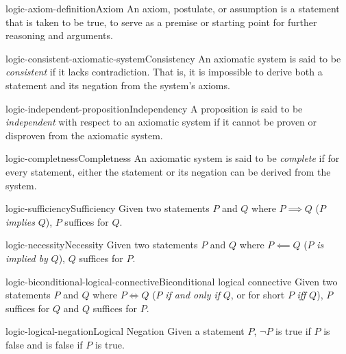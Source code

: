 \documentclass[preview]{standalone}
\begin{document}
\begin{snippet}{logic-axiom-definition}{Axiom}
    An axiom, postulate, or assumption is a statement that is taken to be true, to serve as a premise or starting point for further reasoning and arguments.
\end{snippet}

\begin{snippetdefinition}{logic-consistent-axiomatic-system}{Consistency}
    An axiomatic system is said to be \textit{consistent} if it lacks contradiction.
    That is, it is impossible to derive both a statement and its negation from the system's axioms.
\end{snippetdefinition}

\begin{snippetdefinition}{logic-independent-proposition}{Independency}
    A proposition is said to be \textit{independent} with respect to an axiomatic system
    if it cannot be proven or disproven from the axiomatic system.
\end{snippetdefinition}

\begin{snippetdefinition}{logic-completness}{Completness}
    An axiomatic system is said to be \textit{complete} if for every statement,
    either the statement or its negation can be derived from the system.
\end{snippetdefinition}

\begin{snippetdefinition}{logic-sufficiency}{Sufficiency}
    Given two statements \(P\) and \(Q\) where \(P \implies Q\) (\(P\) \textit{implies} \(Q\)),
    \(P\) suffices for \(Q\).
\end{snippetdefinition}

\begin{snippetdefinition}{logic-necessity}{Necessity}
    Given two statements \(P\) and \(Q\) where \(P \impliedby Q\) (\(P\) \textit{is implied by} \(Q\)),
    \(Q\) suffices for \(P\).
\end{snippetdefinition}

\begin{snippetdefinition}{logic-biconditional-logical-connective}{Biconditional logical connective}
    Given two statements \(P\) and \(Q\) where \(P \iff Q\)
    (\(P\) \textit{if and only if} \(Q\), or for short \(P\) \textit{iff} \(Q\)),
    \(P\) suffices for \(Q\) and \(Q\) suffices for \(P\).
\end{snippetdefinition}

\begin{snippetdefinition}{logic-logical-negation}{Logical Negation}
    Given a statement \(P\), \(\lnot P\) is true if \(P\) is false
    and is false if \(P\) is true.
\end{snippetdefinition}
\end{document}
